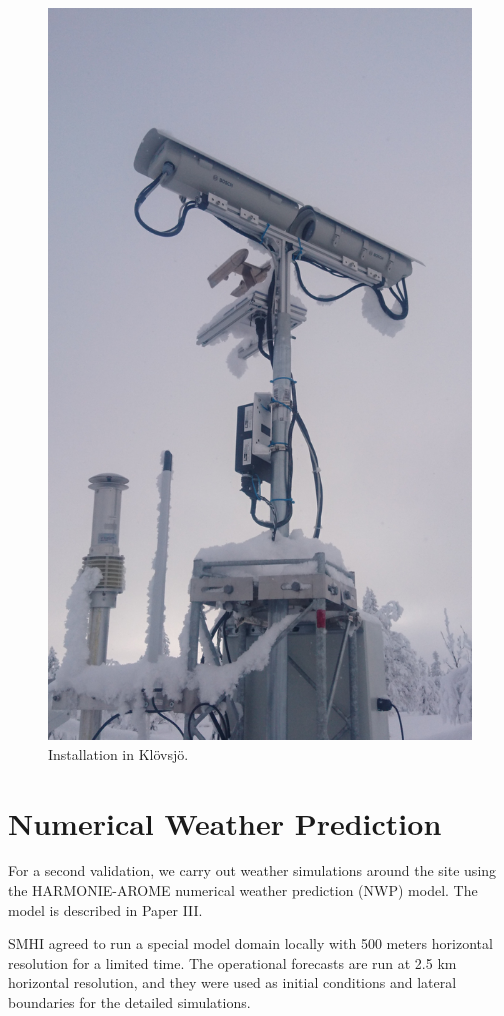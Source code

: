 \begin{figure}[ht]
\centering\includegraphics[width=0.75\linewidth]{figures/installation1}
\caption{Installation in Klövsjö.}
\label{fig:installation1}
\end{figure}


\section{Numerical Weather Prediction}

For a second validation, we carry out weather simulations around the site using the HARMONIE-AROME numerical weather prediction (NWP) model. The model is described in Paper III.

SMHI agreed to run a special model domain locally with 500 meters horizontal resolution for a limited time. The operational forecasts are run at 2.5 km horizontal resolution, and they were used as initial conditions and lateral boundaries for the detailed simulations.


